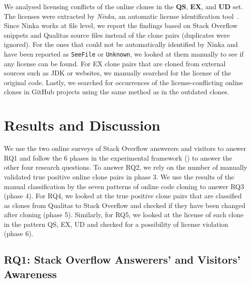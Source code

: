 \documentclass[10pt,journal,compsoc]{IEEEtran}
\begin{document}
We analysed licensing conflicts of the online clones in the \textbf{QS},
\textbf{EX}, and \textbf{UD} set. The licenses were extracted by \emph{Ninka},
an automatic license identification tool~\cite{German2010}. Since Ninka works at
file level, we report the findings based on Stack Overflow snippets and Qualitas
source files instead of the clone pairs (duplicates were ignored). For the ones
that could not be automatically identified by Ninka and have been reported as
{\small\texttt{SeeFile}} or {\small\texttt{Unknown}}, we looked at them manually
to see if any license can be found. For EX clone pairs that are cloned from
external sources such as JDK or websites, we manually searched for the license
of the original code. Lastly, we searched for occurrences of the license-conflicting
online clones in GitHub projects using the same method as in the outdated clones.

\section{Results and Discussion}

We use the two online surveys of Stack Overflow answerers and visitors to answer RQ1
and follow the 6 phases in the experimental framework
() to answer the other four research questions. To answer RQ2,
we rely on the number of manually validated true positive online clone pairs in
phase 3. We use the results of the manual classification by the seven patterns
of online code cloning to answer RQ3 (phase 4). For RQ4, we looked at the true
positive clone pairs that are classified as clones from Qualitas to Stack
Overflow and checked if they have been changed after cloning (phase 5).
Similarly, for RQ5, we looked at the license of each clone in the pattern QS,
EX, UD and checked for a possibility of license violation (phase 6). 

\subsection{RQ1: Stack Overflow Answerers' and Visitors' Awareness}

\end{document}
